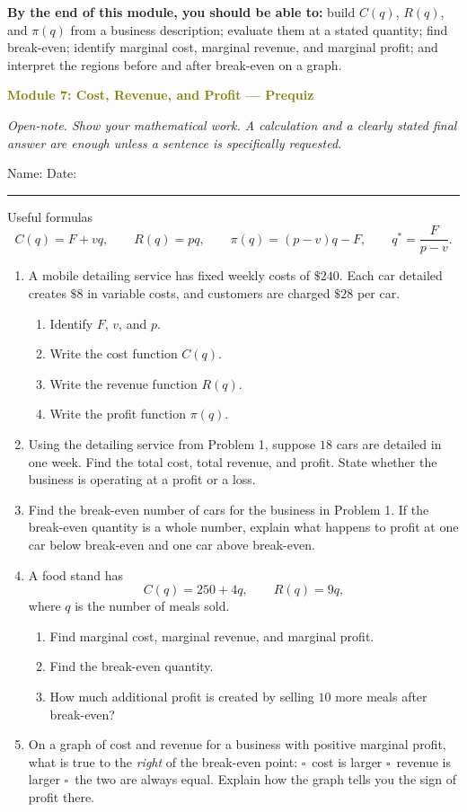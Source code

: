 \documentclass[11pt]{article}
\newcommand{\prequizhead}[2]{%
  \clearpage
  {\Large\bfseries\textcolor{olive}{Module #1: #2 — Prequiz}}\par
  \textit{Open-note. Show your mathematical work. A calculation and a clearly stated final answer are enough unless a sentence is specifically requested.}\par
  Name: \hspace{2.6in} Date: \hspace{1.1in}\par
  \vspace{2pt}\textcolor{gold}{\rule{\linewidth}{1.2pt}}\par\smallskip
}
\newcommand{\workmed}{\par\vspace{0.62in}}
\newcommand{\worklarge}{\par\vspace{0.92in}}
\newcommand{\workxl}{\par\vspace{1.22in}}
\newcommand{\choice}[1]{\(\square\)~#1\qquad}
\begin{document}
\textbf{By the end of this module, you should be able to:} build \(C(q)\), \(R(q)\), and \(\pi(q)\) from a business description; evaluate them at a stated quantity; find break-even; identify marginal cost, marginal revenue, and marginal profit; and interpret the regions before and after break-even on a graph.

\prequizhead{7}{Cost, Revenue, and Profit}
\begin{refbox}{Useful formulas}
\[
C(q)=F+vq,
\qquad R(q)=pq,
\qquad \pi(q)=(p-v)q-F,
\qquad q^*=\frac{F}{p-v}.
\]
\end{refbox}

\begin{enumerate}
\item A mobile detailing service has fixed weekly costs of \(\$240\). Each car detailed creates \(\$8\) in variable costs, and customers are charged \(\$28\) per car.
\begin{enumerate}[label=(\alph*),itemsep=4pt]
\item Identify \(F\), \(v\), and \(p\).
\item Write the cost function \(C(q)\).
\item Write the revenue function \(R(q)\).
\item Write the profit function \(\pi(q)\).
\end{enumerate}
\workxl

\item Using the detailing service from Problem 1, suppose \(18\) cars are detailed in one week. Find the total cost, total revenue, and profit. State whether the business is operating at a profit or a loss.
\worklarge

\item Find the break-even number of cars for the business in Problem 1. If the break-even quantity is a whole number, explain what happens to profit at one car below break-even and one car above break-even.
\worklarge

\item A food stand has
\[
C(q)=250+4q,
\qquad
R(q)=9q,
\]
where \(q\) is the number of meals sold.
\begin{enumerate}[label=(\alph*),itemsep=4pt]
\item Find marginal cost, marginal revenue, and marginal profit.
\item Find the break-even quantity.
\item How much additional profit is created by selling \(10\) more meals after break-even?
\end{enumerate}
\worklarge

\item On a graph of cost and revenue for a business with positive marginal profit, what is true to the \emph{right} of the break-even point: \choice{cost is larger} \choice{revenue is larger} \choice{the two are always equal}. Explain how the graph tells you the sign of profit there.
\workmed
\end{enumerate}
\end{document}
